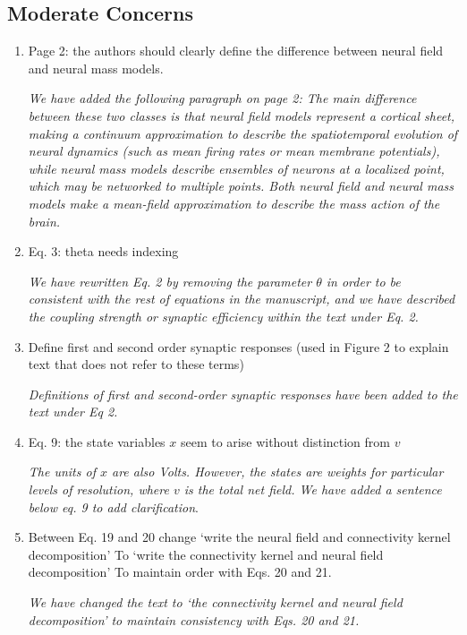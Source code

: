 \documentclass{article}
\begin{document}
			\subsection{Moderate Concerns} 
			\begin{enumerate} 
			 \item Page 2: the authors should clearly define the difference between neural field and neural mass models.
			
			\emph{We have added the following paragraph on page 2: The main difference between these two classes is that neural field models represent a cortical sheet, making a continuum approximation to describe the spatiotemporal evolution of neural dynamics (such as mean firing rates or mean membrane potentials), while neural mass models describe ensembles of neurons at a localized point, which may be networked to multiple points. Both neural field and neural mass models make a mean-field approximation to describe the mass action of the brain.}
			
			\item Eq. 3: theta needs indexing 
 
			\emph{We have rewritten Eq. 2 by removing the parameter $\theta$ in order to be consistent with the rest of equations in the manuscript, and we have described the coupling strength or synaptic efficiency within the text under Eq. 2.}
 			
			\item Define first and second order synaptic responses (used in Figure 2 to explain text that does not refer to these terms)
			
			\emph{Definitions of first and second-order synaptic responses have been added to the text under Eq 2.}
			
			\item{Eq. 9: the state variables $x$ seem to arise without distinction from $v$}  
			
			\emph{The units of $x$ are also Volts. However, the states are weights for particular levels of resolution, where $v$ is the total net field. We have added a sentence below eq. 9 to add clarification}.
			
			\item Between Eq. 19 and 20 change
			`write the neural field and connectivity kernel decomposition' To `write the connectivity kernel and neural field decomposition'
			To maintain order with Eqs. 20 and 21.

			\emph{We have changed the text to `the connectivity kernel and neural field decomposition' to maintain consistency with Eqs. 20 and 21.}
			
			 
			 \end{enumerate}  
\end{document}
